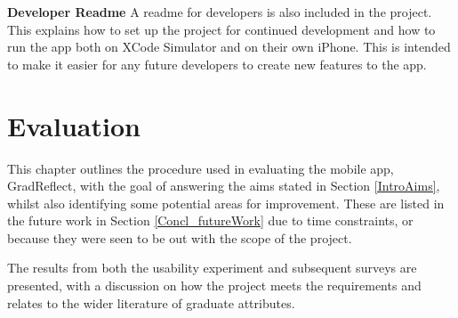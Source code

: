 \documentclass{l4proj}
\begin{document}
\textbf{Developer Readme} A readme for developers is also included in the project. This explains how to set up the project for continued development and how to run the app both on XCode Simulator and on their own iPhone. This is intended to make it easier for any future developers to create new features to the app. 

\chapter{Evaluation} \label{evaluation}

This chapter outlines the procedure used in evaluating the mobile app, GradReflect, with the goal of answering the aims stated in Section \ref{IntroAims}, whilst also identifying some potential areas for improvement. These are listed in the future work in Section \ref{Concl_futureWork} due to time constraints, or because they were seen to be out with the scope of the project. 

The results from both the usability experiment and subsequent surveys are presented, with a discussion on how the project meets the requirements and relates to the wider literature of graduate attributes.




\end{document}
